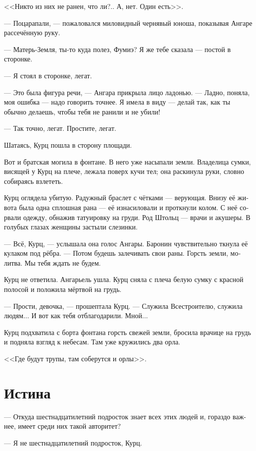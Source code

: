 \documentclass[a4paper,12pt,fleqn]{book}\usepackage{cooltooltips}\usepackage{polyglossia}\setdefaultlanguage[babelshorthands=true]{russian}\setotherlanguage{english}\defaultfontfeatures{Ligatures=TeX,Mapping=tex-text} \usepackage{xcolor}\definecolor{lightgray}{HTML}{bbbbbb}\color{lightgray}\newcommand{\ml}[3]{\textenglish{\textcolor{black}{#3}}}
\begin{document}
<<Никто из них не ранен, что ли?..
А, нет.
Один есть>>.

--- Поцарапали, --- пожаловался миловидный чернявый юноша, показывая Ангаре рассечённую руку.

--- Матерь-Земля, ты-то куда полез, Фумиэ?
Я же тебе сказала --- постой в сторонке.

--- Я стоял в сторонке, легат.

--- Это была фигура речи, --- Ангара прикрыла лицо ладонью.
--- Ладно, поняла, моя ошибка --- надо говорить точнее.
Я имела в виду --- делай так, как ты обычно делаешь, чтобы тебя не ранили и не убили!

--- Так точно, легат.
Простите, легат.

Шатаясь, Курц пошла в сторону площади.

Вот и братская могила в фонтане.
В него уже насыпали земли.
Владелица сумки, висящей у Курц на плече, лежала поверх кучи тел;
она раскинула руки, словно собираясь взлететь.

Курц оглядела убитую.
Радужный браслет с чётками --- верующая.
Внизу её живота была одна сплошная рана --- её изнасиловали и проткнули колом.
С неё сорвали одежду, обнажив татуировку на груди.
Род Штольц --- врачи и акушеры.
В голубых глазах женщины застыли слезинки.

--- Всё, Курц, --- услышала она голос Ангары.
Баронин чувствительно ткнула её кулаком под рёбра.
--- Потом будешь залечивать свои раны.
Горсть земли, молитва.
Мы тебя ждать не будем.

Курц не ответила.
Ангарьель ушла.
Курц сняла с плеча белую сумку с красной полосой и положила мёртвой на грудь.

--- Прости, девочка, --- прошептала Курц.
--- Служила Всестроителю, служила людям...
И вот как тебя отблагодарили.
Мной...

Курц подхватила с борта фонтана горсть свежей земли, бросила врачице на грудь и подняла взгляд к небесам.
Там уже кружились два орла.

<<Где будут трупы, там соберутся и орлы>>.

\section{Истина}

--- Откуда шестнадцатилетний подросток знает всех этих людей и, гораздо важнее, имеет среди них такой авторитет?

--- Я не шестнадцатилетний подросток, Курц.
\end{document}
